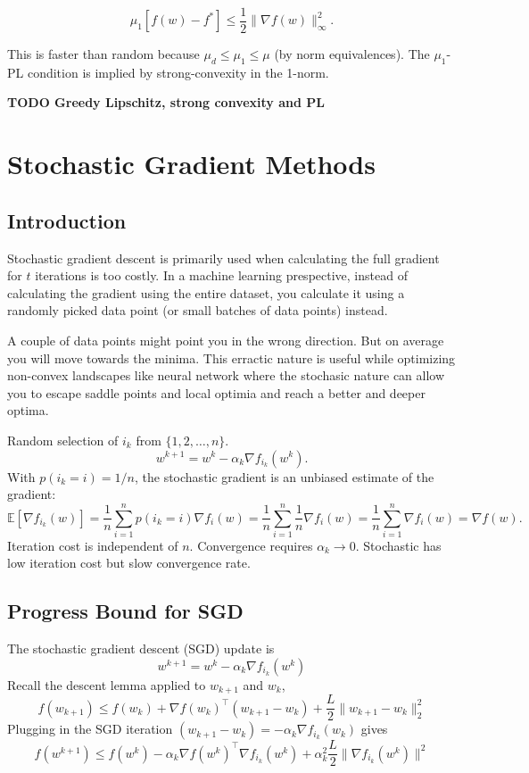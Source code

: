 \documentclass[
]{article}
\begin{document}
\[ \mu_1 [f(w) - f^*] \leq \frac{1}{2} \|\nabla f(w)\|^2_\infty. \]

This is faster than random because \(\mu_d \leq \mu_1 \leq \mu\) (by norm equivalences). The \(\mu_1\)-PL condition is implied by strong-convexity in the 1-norm.

\textbf{TODO Greedy Lipschitz, strong convexity and PL}

\section{Stochastic Gradient Methods}\label{stochastic-gradient-methods}

\subsection{Introduction}\label{introduction}

Stochastic gradient descent is primarily used when calculating the full gradient for \(t\) iterations is too costly. In a machine learning prespective, instead of calculating the gradient using the entire dataset, you calculate it using a randomly picked data point (or small batches of data points) instead.

A couple of data points might point you in the wrong direction. But on average you will move towards the minima. This erractic nature is useful while optimizing non-convex landscapes like neural network where the stochasic nature can allow you to escape saddle points and local optimia and reach a better and deeper optima.

Random selection of \(i_k\) from \(\{1, 2, \ldots, n\}\).
\[ 
w^{k+1} = w^k - \alpha_k \nabla f_{i_k}(w^k). 
\]
With \(p(i_k = i) = 1/n\), the stochastic gradient is an unbiased estimate of the gradient:
\[ 
\mathbb{E}[\nabla f_{i_k}(w)] = \frac{1}{n} \sum_{i=1}^{n} p(i_k = i) \nabla f_i(w) = \frac{1}{n} \sum_{i=1}^{n} \frac{1}{n} \nabla f_i(w) = \frac{1}{n} \sum_{i=1}^{n} \nabla f_i(w) = \nabla f(w). 
\]
Iteration cost is independent of \(n\). Convergence requires \(\alpha_k \to 0\). Stochastic has low iteration cost but slow convergence rate.

\subsection{Progress Bound for SGD}\label{progress-bound-for-sgd}

The stochastic gradient descent (SGD) update is
\[ w^{k+1} = w^k - \alpha_k \nabla f_{i_k}(w^k) \]
Recall the descent lemma applied to \(w_{k+1}\) and \(w_k\),
\[ f(w_{k+1}) \leq f(w_k) + \nabla f(w_k)^\top (w_{k+1} - w_k) + \frac{L}{2} \| w_{k+1} - w_k \|_2^2\]
Plugging in the SGD iteration \((w_{k+1} - w_k) = -\alpha_k \nabla f_{i_k}(w_k)\) gives
\[f(w^{k+1}) \leq f(w^k) - \alpha_k \nabla f(w^k)^\top \nabla f_{i_k}(w^k) + \alpha_k^2 \frac{ L}{2} \|\nabla f_{i_k}(w^k)\|^2 \]
\end{document}
